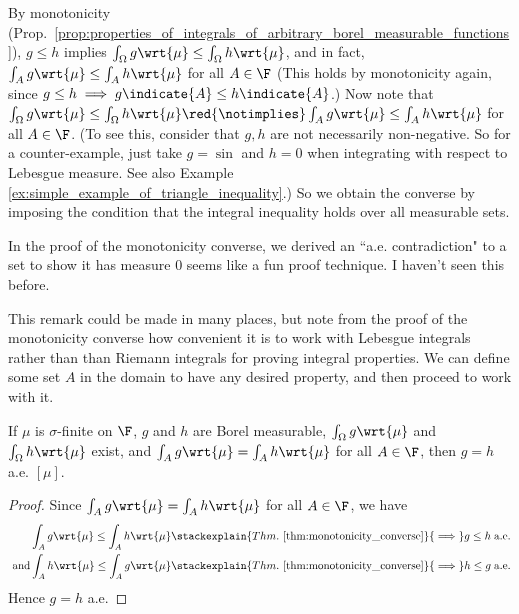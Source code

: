 \documentclass{article} %
\newcommand{\dmu}{\wrt{\mu}}
\begin{document}
\begin{remark}{}
 By monotonicity (Prop.~\ref{prop:properties_of_integrals_of_arbitrary_borel_measurable_functions}), $g \leq h$ implies $\int_\Omega g \dmu \leq \int_\Omega h \dmu$, and in fact, $\int_A g \dmu \leq \int_A h \dmu$ for all $A \in \F$ {\tiny (This holds by monotonicity again, since $g \leq h \implies g \indicate{A} \leq h \indicate{A}$.)}  Now note that $\int_\Omega g \dmu \leq \int_\Omega h \dmu  \red{\notimplies} \int_A g \dmu \leq \int_A h \dmu$ for all $A \in \F$. (To see this, consider that $g,h$ are not necessarily non-negative.  So for a counter-example, just take $g=\sin$ and $h=0$ when integrating with respect to Lebesgue measure.  See also Example \ref{ex:simple_example_of_triangle_inequality}.)  So we obtain the converse by imposing the condition that the integral inequality holds over all measurable sets. 	
\end{remark}

\begin{remark}
In the proof of the monotonicity converse, we derived an ``a.e. contradiction" to a set to show it has measure 0 seems like a fun proof technique.  I haven't seen this before. 
\end{remark}

\begin{remark}
This remark could be made in many places, but note from the proof of the monotonicity converse how convenient it is to work with Lebesgue integrals rather than than Riemann integrals for proving integral properties.  We can define some set $A$ in the domain to have any desired property, and then proceed to work with it. 
\end{remark}


\begin{corollary}
If $\mu$ is $\sigma$-finite on $\F$, $g$ and $h$ are Borel measurable, $\int_\Omega g \dmu$ and $\int_\Omega h \dmu$ exist, and $\int_A g \dmu = \int_A h \dmu$ for all $A \in \F$, then $g = h$ a.e. $[\mu]$.
\label{cor:equal_integrals_for_all_measurable_sets_implies_the_functions_are_equal_ae}
\end{corollary}

\begin{proof}
 Since $\int_A g \dmu = \int_A h \dmu$ for all $A \in \F$, we have  
\begin{align*}
\int_A g \dmu \leq \int_A h \dmu 	& \stackexplain{Thm.~\ref{thm:monotonicity_converse}}{\implies} g \leq h \; \text{a.e.} \\
\text{ and} \int_A h \dmu \leq \int_A g \dmu 	& \stackexplain{Thm.~\ref{thm:monotonicity_converse}}{\implies} h \leq g \; \text{a.e.}
\end{align*}
Hence $g=h$ a.e.
\end{proof}
\end{document}
